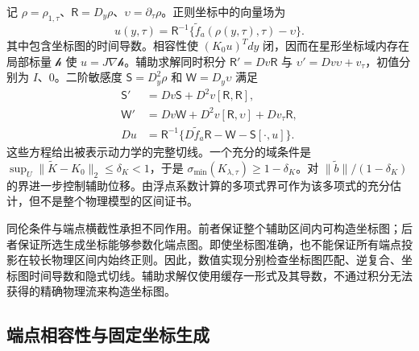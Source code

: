 记 $\rho=\rho_{1,\tau}$、$\mathsf R=D_y\rho$、$\upsilon=\partial_\tau\rho$。正则坐标中的向量场为
\begin{equation}
 u(y,\tau)=\mathsf R^{-1}\{\widetilde f_a(\rho(y,\tau),\tau)-\upsilon\}.
 \label{eq:th-chart-field}
\end{equation}
其中包含坐标图的时间导数。相容性使 $(K_0u)^Tdy$ 闭，因而在星形坐标域内存在局部标量 $\mathcal h$ 使 $u=J\nabla\mathcal h$。辅助求解同时积分 $\mathsf R'=Dv\mathsf R$ 与 $\upsilon'=Dv\upsilon+v_\tau$，初值分别为 $I$、$0$。二阶敏感度 $\mathsf S=D_y^2\rho$ 和 $\mathsf W=D_y\upsilon$ 满足
\begin{equation}
 \begin{aligned}
 \mathsf S'&=Dv\mathsf S+D^2v[\mathsf R,\mathsf R],\\
 \mathsf W'&=Dv\mathsf W+D^2v[\mathsf R,\upsilon]+Dv_\tau\mathsf R,\\
 Du&=\mathsf R^{-1}\{D\widetilde f_a\mathsf R-\mathsf W-\mathsf S[\cdot,u]\}.
 \end{aligned}
 \label{eq:th-chart-sensitivities}
\end{equation}
这些方程给出被表示动力学的完整切线。一个充分的域条件是 $\sup_U\|\widetilde K-K_0\|_2\le\delta_K<1$，于是 $\sigma_{\min}(K_{\lambda,\tau})\ge1-\delta_K$。对 $\|\widetilde b\|/(1-\delta_K)$ 的界进一步控制辅助位移。由浮点系数计算的多项式界可作为该多项式的充分估计，但不是整个物理模型的区间证书。

同伦条件与端点横截性承担不同作用。前者保证整个辅助区间内可构造坐标图；后者保证所选生成坐标能够参数化端点图。即使坐标图准确，也不能保证所有端点投影在较长物理区间内始终正则。因此，数值实现分别检查坐标图匹配、逆复合、坐标图时间导数和隐式切线。辅助求解仅使用缓存一形式及其导数，不通过积分无法获得的精确物理流来构造坐标图。

\subsection{端点相容性与固定坐标生成}
